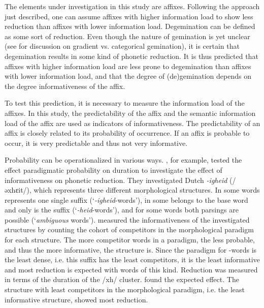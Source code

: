 {The elements under investigation in this study are affixes. Following the approach just described, one can assume affixes with higher information load to show less reduction than affixes with lower information load. Degemination can be defined as some sort of reduction. Even though the nature of gemination is yet unclear (see  for discussion on gradient vs. categorical gemination), it is certain that degemination results in some kind of phonetic reduction. It is thus predicted that affixes with higher information load are less prone to degemination than affixes with lower information load, and that the degree of (de)gemination depends on the degree informativeness of the affix.

To test this prediction, it is necessary to measure the information load of the affixes.
 In this study, the predictability of the affix and the semantic information load of the affix are used as indicators of informativeness.
The predictability of an affix is closely related to its probability of occurrence. 
 If an affix is probable to occur, it is very predictable and thus not very informative. %

 
 Probability can be operationalized in various ways. 
   \cite{Pluymaekers.2010}, for example, tested the effect paradigmatic probability on duration to investigate the effect of informativeness on phonetic reduction.
 They investigated Dutch \textit{-igheid} (/əxhɛit/), which represents three different morphological structures. In some words  represents one single suffix (`\textit{-igheid}-words'), in some  belongs to the base word and only  is the suffix (`\textit{-heid}-words'), and for some words both parsings are possible (`\textit{ambiguous} words'). \cite{Pluymaekers.2010} measured the informativeness of the investigated structures by counting the cohort of competitors in the morphological paradigm for each structure. 
 The more competitor words in a paradigm, the less probable, and thus the more informative, the structure is.  Since the paradigm for -words is the least dense, i.e. this suffix has the least competitors, it is the least informative and most reduction is expected with words of this kind. Reduction was measured in terms of the duration of the /xh/ cluster. \cite{Pluymaekers.2010} found the expected effect. The structure with least competitors in the morphological paradigm, i.e. the least informative structure, showed most reduction.
  
}
